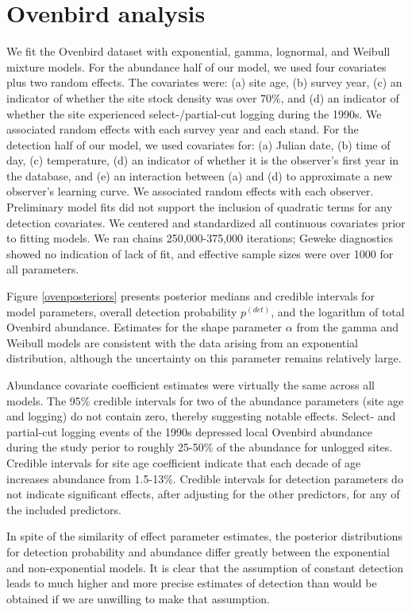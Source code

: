 \documentclass[12pt]{article}
\newcommand{\pdet}{p^{(det)}}
\begin{document}
\section{Ovenbird analysis}\label{sec:ovenbirds}

We fit the Ovenbird dataset with exponential, gamma, lognormal, and Weibull mixture models.  
For the abundance half of our model, we used four covariates plus two random effects.  
The covariates were: (a) site age, (b) survey year, (c) an indicator of whether the site stock density was over 70\%, and (d) an indicator of whether the site experienced select-/partial-cut logging during the 1990s.  
We associated random effects with each survey year and each stand.
For the detection half of our model, we used covariates for: (a) Julian date, (b) time of day, (c) temperature, (d) an indicator of whether it is the observer's first year in the database, and (e) an interaction between (a) and (d) to approximate a new observer's learning curve.  
We associated random effects with each observer.  
Preliminary model fits did not support the inclusion of quadratic terms for any detection covariates.  
We centered and standardized all continuous covariates prior to fitting models.
We ran chains 250,000-375,000 iterations; Geweke diagnostics showed no indication of lack of fit, and effective sample sizes were over 1000 for all parameters.


Figure \ref{ovenposteriors} presents posterior medians and credible intervals for model parameters, overall detection probability $\pdet$, and the logarithm of total Ovenbird abundance.  
Estimates for the shape parameter $\alpha$ from the gamma and Weibull models are consistent with the data arising from an exponential distribution, although the uncertainty on this parameter remains relatively large. 

Abundance covariate coefficient estimates were virtually the same across all models.  
The 95\% credible intervals for two of the abundance parameters (site age and logging) do not contain zero, thereby suggesting notable effects.  
Select- and partial-cut logging events of the 1990s depressed local Ovenbird abundance during the study perior to roughly 25-50\% of the abundance for unlogged sites.  
Credible intervals for site age coefficient indicate that each decade of age increases abundance from 1.5-13\%.
Credible intervals for detection parameters do not indicate significant effects, after adjusting for the other predictors, for any of the included predictors.

In spite of the similarity of effect parameter estimates, the posterior distributions for detection probability and abundance differ greatly between the exponential and non-exponential models.  
It is clear that the assumption of constant detection leads to much higher and more precise estimates of detection than would be obtained if we are unwilling to make that assumption.
\end{document}
